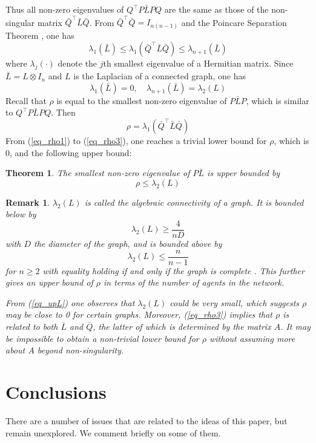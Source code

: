 \documentclass{aims}
\newtheorem{remark}{Remark}
\newtheorem{thm}{\textbf{Theorem}}
\def\eq#1{\begin{equation}#1\end{equation}}
\begin{document}
Thus all non-zero eigenvalues of $Q^{\top}P\bar{L}PQ$ are the same as those of the non-singular matrix $\bar{Q}^{\top}\bar{L}\bar{Q}$. From $\bar{Q}^{\top}\bar{Q}=I_{n(n-1)}$ and the Poincare Separation Theorem \cite{RC85Book}, one has \eq{\label{eq_rho1}\lambda_1(\bar{L})\leq \lambda_1(\bar Q^{\top} \bar L \bar Q)\leq \lambda_{n+1}(\bar L)} where $\lambda_j(\cdot)$ denote the $j$th smallest eigenvalue of a Hermitian matrix. Since $\bar{L}=L\otimes I_n$ and $L$ is the Laplacian of a connected graph, one has \eq{\label{eq_rho2}\lambda_1(\bar L)=0,\quad \lambda_{n+1}(\bar L)=\lambda_2(L)}
Recall that $\rho$ is equal to the smallest non-zero eigenvalue of $P\bar{L}P$, which is similar to $Q^{\top}P\bar{L}PQ$. Then \eq{\label{eq_rho3}\rho=\lambda_1(\bar{Q}^{\top}\bar{L}\bar{Q})} From (\ref{eq_rho1}) to (\ref{eq_rho3}), one reaches a trivial lower bound for $\rho$, which is 0, and the following upper bound:
\begin{thm}
The smallest non-zero eigenvalue of $P\bar{L}$ is upper bounded by \eq{ \rho \leq \lambda_2(L)}
\end{thm}
\begin{remark}
$\lambda_2(L)$ is called the algebraic connectivity of a graph. It is bounded below by \cite{Mohar91} \eq{\label{eq_upL}\lambda_2(L)\geq \frac{4}{nD}} with $D$ the diameter of the graph, and is bounded above by  $$\lambda_2(L)\leq \frac{n}{n-1}$$ for $n\geq 2$ with equality holding if and only if the graph is complete \cite{Fan97}. This further gives an upper bound of $\rho$ in terms of the number of agents in the network.

From (\ref{eq_upL}) one observes that $\lambda_2(L)$ could be very small, which suggests $\rho$ may be close to 0 for certain graphs. Moreover, (\ref{eq_rho3}) implies that $\rho$ is related to both $\bar{L}$ and $\bar{Q}$, the latter of which is determined by the matrix $A$. It may be impossible to obtain a non-trivial lower bound for $\rho$ without assuming more about $A$ beyond non-singularity.
\end{remark}
\section{Conclusions}

There are a number of issues that are related to the ideas of this paper, but remain unexplored. We comment briefly on some of them.
\end{document}
